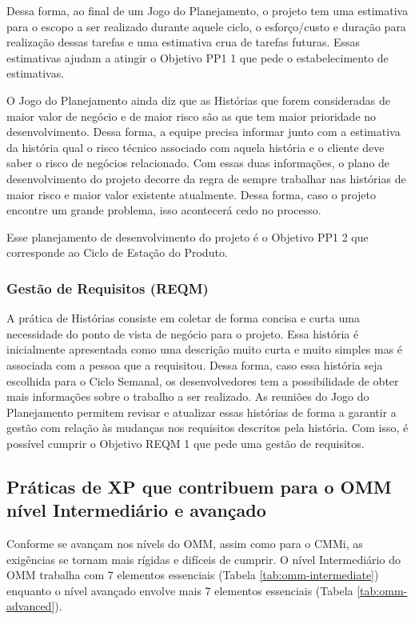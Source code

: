 Dessa forma, ao final de um Jogo do Planejamento, o projeto tem uma
estimativa para o escopo a ser realizado durante aquele ciclo, o
esforço/custo e duração para realização dessas tarefas e uma
estimativa crua de tarefas futuras. Essas estimativas ajudam a atingir
o Objetivo PP1 1 que pede o estabelecimento de estimativas.

O Jogo do Planejamento ainda diz que as Histórias que forem
consideradas de maior valor de negócio e de maior risco são as que tem
maior prioridade no desenvolvimento. Dessa forma, a equipe precisa
informar junto com a estimativa da história qual o risco técnico associado com
aquela história e o cliente deve saber o risco de negócios
relacionado. Com essas duas informações, o plano de desenvolvimento do
projeto decorre da regra de sempre trabalhar nas histórias de maior
risco e maior valor existente atualmente. Dessa forma, caso o projeto
encontre um grande problema, isso acontecerá cedo no processo.

Esse planejamento de desenvolvimento do projeto é o Objetivo PP1 2 que
corresponde ao Ciclo de Estação do Produto.

\subsubsection{Gestão de Requisitos (REQM)}
\label{sec:+reqm}

A prática de Histórias consiste em coletar de forma concisa e curta uma
necessidade do ponto de vista de negócio para o projeto. Essa história
é inicialmente apresentada como uma descrição muito curta e muito
simples mas é associada com a pessoa que a requisitou. Dessa forma,
caso essa história seja escolhida para o Ciclo Semanal, os
desenvolvedores tem a possibilidade de obter mais informações sobre o
trabalho a ser realizado. As reuniões do Jogo do Planejamento permitem
revisar e atualizar essas histórias de forma a garantir a gestão com
relação às mudanças nos requisitos descritos pela história. Com isso,
é possível cumprir o Objetivo REQM 1 que pede uma gestão de
requisitos.

\subsection{Práticas de XP que contribuem para o OMM nível
  Intermediário e avançado}
\label{sec:xp-omm-intermediate}

Conforme se avançam nos nívels do OMM, assim como para o CMMi, as
exigências se tornam mais rígidas e difíceis de cumprir. O nível
Intermediário do OMM trabalha com 7 elementos essenciais (Tabela
\ref{tab:omm-intermediate}) enquanto o nível avançado envolve mais 7
elementos essenciais (Tabela \ref{tab:omm-advanced}).

